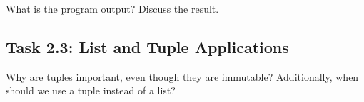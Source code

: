 \documentclass[11pt]{article}
\begin{document}
\noindent
What is the program output? Discuss the result.
\begin{tcolorbox}[colback=black!10!white, colframe=black!75!white, title=\textbf{Answer}]
    \vspace{3cm}
\end{tcolorbox} 

\subsection*{Task 2.3: List and Tuple Applications}
Why are tuples important, even though they are immutable? Additionally, when should we use a tuple instead of a list?
\begin{tcolorbox}[colback=black!10!white, colframe=black!75!white, title=\textbf{Answer}]
    \vspace{3cm}
\end{tcolorbox} 
\end{document}
